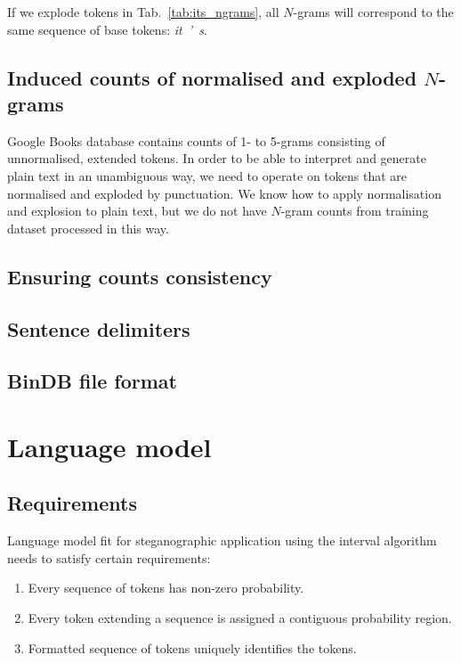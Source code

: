 \documentclass{IIBproject}
\begin{document}
If we explode tokens in Tab.~\ref{tab:its_ngrams}, all $N$-grams will correspond to the same sequence of base tokens: \emph{it\ '\ s}.

\subsection{Induced counts of normalised and exploded $N$-grams}

Google Books database contains counts of 1- to 5-grams consisting of unnormalised, extended tokens. In order to be able to interpret and generate plain text in an unambiguous way, we need to operate on tokens that are normalised and exploded by punctuation. We know how to apply normalisation and explosion to plain text, but we do not have $N$-gram counts from training dataset processed in this way.

\subsection{Ensuring counts consistency}

\subsection{Sentence delimiters}

\subsection{BinDB file format}

\section{Language model}

\subsection{Requirements}
\label{eq:lm_requirements}

Language model fit for steganographic application using the interval algorithm needs to satisfy certain requirements:

\begin{enumerate}
  \item \label{lm_req:non_zero_probability} Every sequence of tokens has non-zero probability.
  \item \label{lm_req:contiguous_probability} Every token extending a sequence is assigned a contiguous probability region.
  \item \label{lm_req:hidden_symbols} Formatted sequence of tokens uniquely identifies the tokens.
\end{enumerate}
\end{document}
